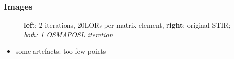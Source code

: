 \documentclass{beamer}
\begin{document}
\begin{frame}
  \frametitle{Images}
  \begin{figure}
    \centering
    \caption{\textbf{left}: 2 iterations, 20LORs per matrix element, \textbf{right}: original STIR; \textsl{both: 1 OSMAPOSL iteration}}
  \end{figure}
  \begin{itemize}
    \item some artefacts: too few points
  \end{itemize}
\end{frame}
\end{document}
